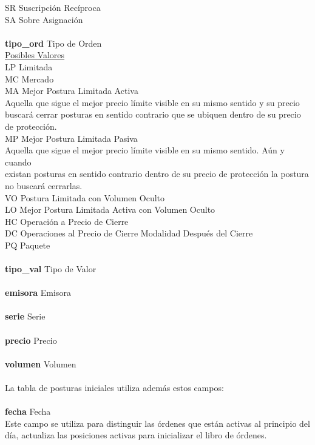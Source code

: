\documentclass[11pt]{article}
\numberwithin{equation}{section} %
\begin{document}
\begin{tabbing}
SR \> Suscripción Recíproca\\
SA \> Sobre Asignación\\
\\
\textbf{tipo\_ord} \> Tipo de Orden\\
\underline{Posibles Valores} \\
LP \> Limitada\\
MC \> Mercado\\
MA \> Mejor Postura Limitada Activa\\
Aquella que sigue el mejor precio límite visible en su mismo sentido y su precio \\
buscará cerrar posturas en sentido contrario que se ubiquen dentro de su precio\\
de protección.\\
MP \> Mejor Postura Limitada Pasiva\\
Aquella que sigue el mejor precio límite visible en su mismo sentido. Aún y cuando\\
existan posturas en sentido contrario dentro de su precio de protección la postura\\
no buscará cerrarlas.\\
VO \> Postura Limitada con Volumen Oculto\\
LO \> Mejor Postura Limitada Activa con Volumen Oculto\\
HC \> Operación a Precio de Cierre\\
DC \> Operaciones al Precio de Cierre Modalidad Después del Cierre\\
PQ \> Paquete \\
\\
\textbf{tipo\_val} \> Tipo de Valor\\
\\
\textbf{emisora} \> Emisora\\
\\
\textbf{serie} \> Serie\\
\\
\textbf{precio} \> Precio\\
\\
\textbf{volumen} \> Volumen\\
\\
La tabla de posturas iniciales utiliza además estos campos:\\
\\
\textbf{fecha} \> Fecha\\
Este campo se utiliza para distinguir las órdenes que están activas al principio del\\
día, actualiza las posiciones activas para inicializar el libro de órdenes.\\

\end{tabbing}
\end{document}
